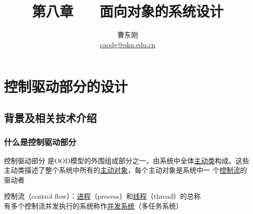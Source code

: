 \documentclass[compress]{beamer}
\begin{document}

					
\title{第八章 ~~  面向对象的系统设计\MakeUppercase{}}

\author[面向对象的分析与设计]
{曹东刚\\\href{mailto:caodg@pku.edu.cn}{caodg@pku.edu.cn}}


\date{}


\begin{frame}[plain]
	\titlepage
\end{frame}

\setcounter{framenumber}{0}

\section{控制驱动部分的设计}

\subsection[背景]{背景及相关技术介绍}

\begin{frame}
  \frametitle{什么是控制驱动部分}
  \begin{block}{控制驱动部分}
    是OOD模型的外围组成部分之一，由系统中全体\uline{主动类}构成。这些
    主动类描述了整个系统中所有的\uline{主动对象}，每个主动对象是系统中一
    个\uline{控制流}的驱动者 
  \end{block}

  控制流（control flow）：\uline{进程}（process）和\uline{线程}（thread）的总称 \\

  有多个控制流并发执行的系统称作\uline{并发系统}（多任务系统）

\end{frame}
\end{document}
